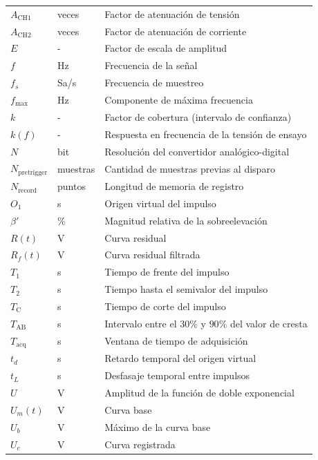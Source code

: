 \begin{xltabular}{\linewidth}{llX}
    $A_{\text{CH1}}$ & veces & Factor de atenuación de tensión\\
    $A_{\text{CH2}}$ & veces & Factor de atenuación de corriente\\
    $E$ & - & Factor de escala de amplitud\\
    $f$ & \unit{\hertz} & Frecuencia de la señal\\
    $f_s$ & \unit{Sa/s} & Frecuencia de muestreo\\
    $f_{\max}$ & \unit{\hertz} & Componente de máxima frecuencia\\
    $k$ & - & Factor de cobertura (intervalo de confianza)\\
    $k(f)$ & - & Respuesta en frecuencia de la tensión de ensayo\\
    $N$ & bit & Resolución del convertidor analógico-digital\\
    $N_{\text{pretrigger}}$ & muestras & Cantidad de muestras previas al disparo\\
    $N_{\text{record}}$ & puntos & Longitud de memoria de registro\\
    $O_1$ & \unit{\second} & Origen virtual del impulso\\
    $\beta'$ & \unit{\percent} & Magnitud relativa de la sobreelevación\\
    $R(t)$ & \unit{\volt} & Curva residual\\
    $R_f(t)$ & \unit{\volt} & Curva residual filtrada\\
    $T_1$ & \unit{\second} & Tiempo de frente del impulso\\
    $T_2$ & \unit{\second} & Tiempo hasta el semivalor del impulso\\
    $T_\text{C}$ & \unit{\second} & Tiempo de corte del impulso\\
    $T_{\text{AB}}$ & \unit{\second} & Intervalo entre el $30\%$ y $90\%$ del valor de cresta\\
    $T_{\text{acq}}$ & \unit{\second} & Ventana de tiempo de adquisición\\
    $t_d$ & \unit{\second} & Retardo temporal del origen virtual\\
    $t_L$ & \unit{\second} & Desfasaje temporal entre impulsos\\
    $U$ & \unit{\volt} & Amplitud de la función de doble exponencial\\
    $U_m(t)$ & \unit{\volt} & Curva base\\
    $U_b$ & \unit{\volt} & Máximo de la curva base\\
    $U_e$ & \unit{\volt} & Curva registrada\\

\end{xltabular}
